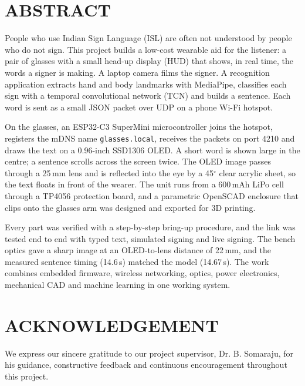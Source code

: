 \documentclass[12pt,a4paper]{report}
\begin{document}
\chapter*{ABSTRACT}

People who use Indian Sign Language (ISL) are often not understood by people who do not sign. This project builds a low-cost wearable aid for the listener: a pair of glasses with a small head-up display (HUD) that shows, in real time, the words a signer is making. A laptop camera films the signer. A recognition application extracts hand and body landmarks with MediaPipe, classifies each sign with a temporal convolutional network (TCN) and builds a sentence. Each word is sent as a small JSON packet over UDP on a phone Wi-Fi hotspot.

On the glasses, an ESP32-C3 SuperMini microcontroller joins the hotspot, registers the mDNS name \texttt{glasses.local}, receives the packets on port 4210 and draws the text on a 0.96-inch SSD1306 OLED. A short word is shown large in the centre; a sentence scrolls across the screen twice. The OLED image passes through a 25\,mm lens and is reflected into the eye by a 45$^\circ$ clear acrylic sheet, so the text floats in front of the wearer. The unit runs from a 600\,mAh LiPo cell through a TP4056 protection board, and a parametric OpenSCAD enclosure that clips onto the glasses arm was designed and exported for 3D printing.

Every part was verified with a step-by-step bring-up procedure, and the link was tested end to end with typed text, simulated signing and live signing. The bench optics gave a sharp image at an OLED-to-lens distance of 22\,mm, and the measured sentence timing (14.6\,s) matched the model (14.67\,s). The work combines embedded firmware, wireless networking, optics, power electronics, mechanical CAD and machine learning in one working system.

\chapter*{ACKNOWLEDGEMENT}

We express our sincere gratitude to our project supervisor, Dr. B. Somaraju, for his guidance, constructive feedback and continuous encouragement throughout this project.
\end{document}
